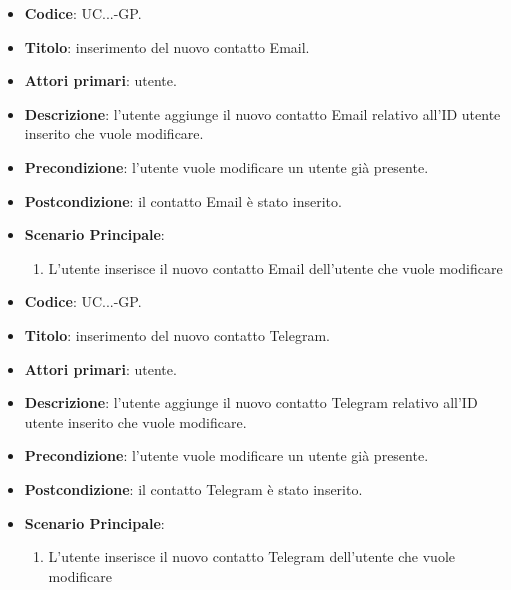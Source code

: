 				
				\begin{itemize}
					\item \textbf{Codice}: UC\theuccount.\thesubuccount.\thesubsubuccount.\thesubsubsubuccount-GP.
					\item \textbf{Titolo}: inserimento del nuovo contatto Email.
					\item \textbf{Attori primari}: utente.
					\item \textbf{Descrizione}: l'utente aggiunge il nuovo contatto Email relativo all'ID utente inserito che vuole modificare.
					\item \textbf{Precondizione}: l'utente vuole modificare un utente già presente.
					\item \textbf{Postcondizione}: il contatto Email è stato inserito.
					\item \textbf{Scenario Principale}:
					\begin{enumerate}
						\item L'utente inserisce il nuovo contatto Email dell'utente che vuole modificare
					\end{enumerate}
				\end{itemize}
			
				
				\begin{itemize}
					\item \textbf{Codice}: UC\theuccount.\thesubuccount.\thesubsubuccount.\thesubsubsubuccount-GP.
					\item \textbf{Titolo}: inserimento del nuovo contatto Telegram.
					\item \textbf{Attori primari}: utente.
					\item \textbf{Descrizione}: l'utente aggiunge il nuovo contatto Telegram relativo all'ID utente inserito che vuole modificare.
					\item \textbf{Precondizione}: l'utente vuole modificare un utente già presente.
					\item \textbf{Postcondizione}: il contatto Telegram è stato inserito.
					\item \textbf{Scenario Principale}:
					\begin{enumerate}
						\item L'utente inserisce il nuovo contatto Telegram dell'utente che vuole modificare
					\end{enumerate}
				\end{itemize}
			
